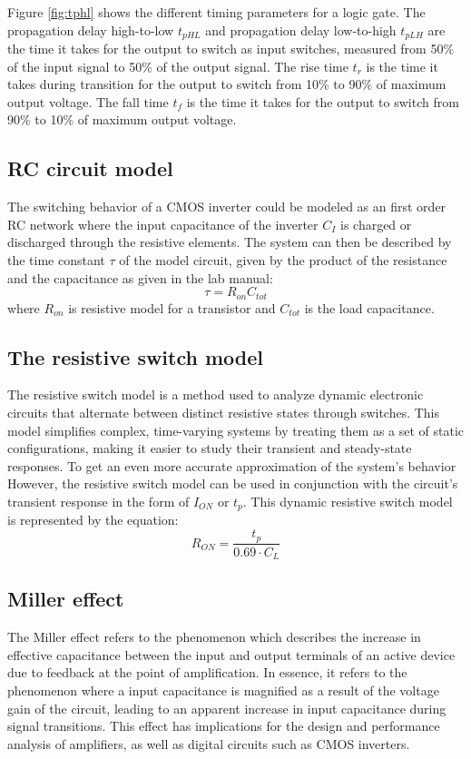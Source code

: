 \documentclass[onecolumn]{article}
\begin{document}
Figure \ref{fig:tphl} shows the different timing parameters for a logic gate. The propagation delay high-to-low $t_{pHL}$ and propagation delay low-to-high $t_{pLH}$ are the time it takes for the output to switch as input switches, measured from 50\% of the input signal to 50\% of the output signal. The rise time $t_{r}$ is the time it takes during transition for the output to switch from 10\% to 90\% of maximum output voltage. The fall time $t_{f}$ is the time it takes for the output to switch from 90\% to 10\% of maximum output voltage.

\subsection{RC circuit model}
The switching behavior of a CMOS inverter could be modeled as an first order RC network where the input capacitance of the inverter $C_I$ is charged or discharged through the resistive elements. The system can then be described by the time constant $\tau$ of the model circuit, given by the product of the resistance and the capacitance as given in the lab manual:
\begin{equation}\label{eq:tau} \tau = R_{on}C_{tot}\end{equation}
 where $R_{on}$ is resistive model for a transistor and $C_{tot}$ is the load capacitance.

\clearpage

\subsection{The resistive switch model}
The resistive switch model is a method used to analyze dynamic electronic circuits that alternate between distinct resistive states through switches. This model simplifies complex, time-varying systems by treating them as a set of static configurations, making it easier to study their transient and steady-state responses. To get an even more accurate approximation of the system's behavior However, the resistive switch model can be used in conjunction with the circuit's transient response in the form of $I_{ON}$ or $t_p$. This dynamic resistive switch model is represented by the equation:
\begin{equation}\label{eq:ron}
    R_{ON} = \frac{t_p}{0.69 \cdot C_L}
\end{equation}


\subsection{Miller effect}
The Miller effect refers to the phenomenon which describes the increase in effective capacitance between the input and output terminals of an active device due to feedback at the point of amplification. In essence, it refers to the phenomenon where a input capacitance is magnified as a result of the voltage gain of the circuit, leading to an apparent increase in input capacitance during signal transitions. This effect has implications for the design and performance analysis of amplifiers, as well as digital circuits such as CMOS inverters.
\end{document}
